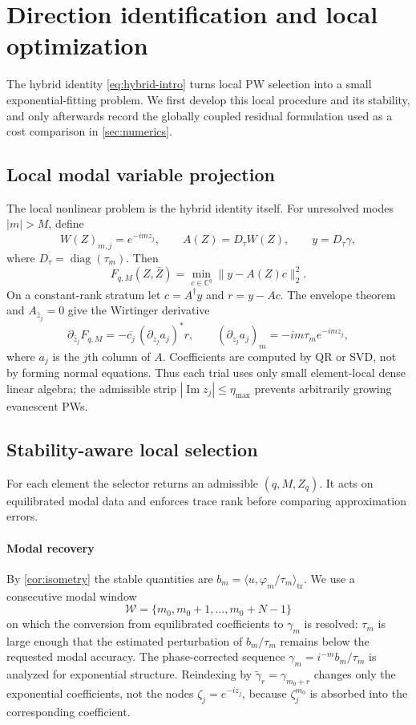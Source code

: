 \documentclass[11pt]{article}
\newcommand{\ii}{i}
\newcommand{\C}{\mathbb{C}}
\DeclareMathOperator{\diag}{diag}
\renewcommand{\Im}{\operatorname{Im}}
\numberwithin{equation}{section}
\begin{document}
\section{Direction identification and local optimization}\label{sec:optimization}
The hybrid identity \eqref{eq:hybrid-intro} turns local PW selection into a small exponential-fitting problem.  We first develop this local procedure and its stability, and only afterwards record the globally coupled residual formulation used as a cost comparison in \cref{sec:numerics}.

\subsection{Local modal variable projection}
The local nonlinear problem is the hybrid identity itself.  For unresolved modes $|m|>M$, define
\begin{equation}\label{eq:modal-matrices}
 W(Z)_{m,j}=e^{-\ii mz_j},\qquad A(Z)=D_\tau W(Z),\qquad y=D_\tau\gamma,
\end{equation}
where $D_\tau=\diag(\tau_m)$.  Then
\begin{equation}\label{eq:modal-varpro}
 F_{q,M}(Z,\bar Z)=\min_{c\in\C^q}\|y-A(Z)c\|_2^2.
\end{equation}
On a constant-rank stratum let $c=A^\dagger y$ and $r=y-Ac$.  The envelope theorem and $A_{\bar z_j}=0$ give the Wirtinger derivative
\begin{equation}\label{eq:modal-wirtinger}
 \partial_{\bar z_j}F_{q,M}
 =-\overline{c_j}\,(\partial_{z_j}a_j)^*r,
 \qquad
 (\partial_{z_j}a_j)_m=-\ii m\tau_m e^{-\ii mz_j},
\end{equation}
where $a_j$ is the $j$th column of $A$.  Coefficients are computed by QR or SVD, not by forming normal equations.  Thus each trial uses only small element-local dense linear algebra; the admissible strip $|\Im z_j|\le\eta_{\max}$ prevents arbitrarily growing evanescent PWs.

\subsection{Stability-aware local selection}\label{sec:selector}
For each element the selector returns an admissible $(q,M,Z_q)$.  It acts on equilibrated modal data and enforces trace rank before comparing approximation errors.

\paragraph{Modal recovery}
By \cref{cor:isometry} the stable quantities are $b_m=\langle u,\varphi_m/\tau_m\rangle_{\mathrm{tr}}$.  We use a consecutive modal window
\[
 \mathcal W=\{m_0,m_0+1,\ldots,m_0+N-1\}
\]
on which the conversion from equilibrated coefficients to $\gamma_m$ is resolved: $\tau_m$ is large enough that the estimated perturbation of $b_m/\tau_m$ remains below the requested modal accuracy.  The phase-corrected sequence $\gamma_m=\ii^{-m}b_m/\tau_m$ is analyzed for exponential structure.  Reindexing by $\widetilde\gamma_r=\gamma_{m_0+r}$ changes only the exponential coefficients, not the nodes $\zeta_j=e^{-\ii z_j}$, because $\zeta_j^{m_0}$ is absorbed into the corresponding coefficient.
\end{document}
